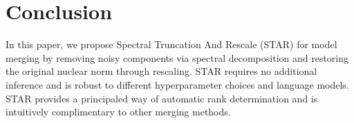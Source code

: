 \section{Conclusion}
In this paper, we propose Spectral Truncation And Rescale (STAR) for model merging by removing noisy components via spectral decomposition and restoring the original nuclear norm through rescaling. STAR requires no additional inference and is robust to different hyperparameter choices and language models. STAR provides a principaled way of automatic rank determination and is intuitively complimentary to other merging methods.



%
